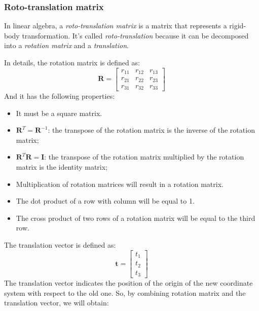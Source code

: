 \subsubsection*{Roto-translation matrix}
In linear algebra, a \textit{roto-translation matrix} is a matrix that represents a rigid-body transformation.
It's called \textit{roto-translation} because it can be decomposed into a \textit{rotation matrix} and a \textit{translation}.

In details, the rotation matrix is defined as:
\begin{equation}
    \textbf{R} = \begin{bmatrix}
                     r_{11} & r_{12} & r_{13} \\
                     r_{21} & r_{22} & r_{23} \\
                     r_{31} & r_{32} & r_{33}
    \end{bmatrix}
    \label{eq:rotation_matrix}
\end{equation}
And it has the following properties:
\begin{itemize}
    \item It must be a square matrix.
    \item $\textbf{R}^T = \textbf{R}^{-1}$: the transpose of the rotation matrix is the inverse of the rotation matrix;
    \item $\textbf{R}^T \textbf{R} = \textbf{I}$: the transpose of the rotation matrix multiplied by the rotation matrix is the identity matrix;
    \item Multiplication of rotation matrices will result in a rotation matrix.
    \item The dot product of a row with column will be equal to 1.
    \item The cross product of two rows of a rotation matrix will be equal to the third row.
\end{itemize}
The translation vector is defined as:
\begin{equation}
    \textbf{t} = \begin{bmatrix}
                     t_{1} \\
                     t_{2} \\
                     t_{3}
    \end{bmatrix}
    \label{eq:translation_vector}
\end{equation}
The translation vector indicates the position of the origin of the new coordinate system with respect to the old one.
So, by combining rotation matrix and the translation vector, we will obtain:
